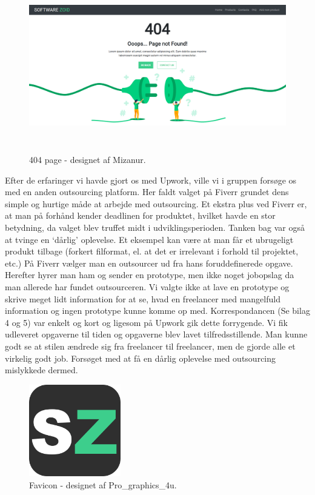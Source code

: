 \documentclass[11pt]{report}
\begin{document}
\begin{figure}[H]
  \centering
    \includegraphics[height=7.5cm, width=15cm]{404Page.png}
    \caption*{404 page - designet af Mizanur.}
\end{figure}

Efter de erfaringer vi havde gjort os med Upwork, ville vi i gruppen forsøge os med en anden outsourcing platform. Her faldt valget på Fiverr grundet dens simple og hurtige måde at arbejde med outsourcing. Et ekstra plus ved Fiverr er, at man på forhånd kender deadlinen for produktet, hvilket havde en stor betydning, da valget blev truffet midt i udviklingsperioden. Tanken bag var også at tvinge en ‘dårlig’ oplevelse. Et eksempel kan være at man får et ubrugeligt produkt tilbage (forkert filformat, el. at det er irrelevant i forhold til projektet, etc.)  
På Fiverr vælger man en outsourcer ud fra hans foruddefinerede opgave. Herefter hyrer man ham og sender en prototype, men ikke noget jobopslag da man allerede har fundet outsourceren. Vi valgte ikke at lave en prototype og skrive meget lidt information for at se, hvad en freelancer med mangelfuld information og ingen prototype kunne komme op med. Korrespondancen (Se bilag 4 og 5) var enkelt og kort og ligesom på Upwork gik dette forrygende. Vi fik udleveret opgaverne til tiden og opgaverne blev lavet tilfredsstillende. Man kunne godt se at stilen ændrede sig fra freelancer til freelancer, men de gjorde alle et virkelig godt job. Forsøget med at få en dårlig oplevelse med outsourcing mislykkede dermed.

\begin{figure}[H]
  \centering
    \includegraphics[height=4cm, width=4cm]{Favicon.png}
    \caption*{Favicon - designet af Pro\_graphics\_4u.}
\end{figure}
\end{document}
